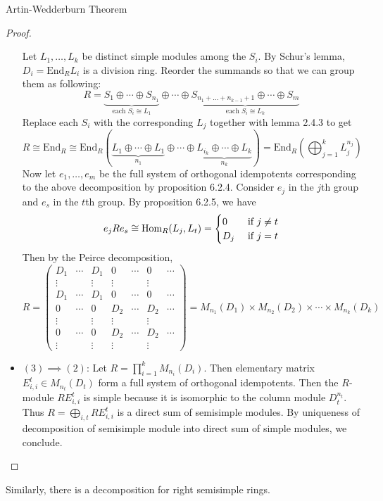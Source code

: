 \documentclass[a4paper]{article}
\begin{document}
\begin{thm}{Artin-Wedderburn Theorem}{}
\begin{proof}
\begin{itemize}
Let $L_1,\dots,L_k$ be distinct simple modules among the $S_i$. By Schur's lemma, $D_i=\text{End}_RL_i$ is a division ring. Reorder the summands so that we can group them as following: $$R=\underbrace{S_1\oplus\cdots\oplus S_{n_1}}_{\text{each }S_i\cong L_1}\oplus\cdots\oplus\underbrace{S_{n_1+\dots+n_{k-1}+1}\oplus\cdots\oplus S_m}_{\text{each }S_i\cong L_k}$$ Replace each $S_i$ with the corresponding $L_j$ together with lemma 2.4.3 to get $$R\cong\text{End}_R\cong\text{End}_R\left(\underbrace{L_1\oplus\cdots\oplus L_1}_{n_1}\oplus\cdots\oplus\underbrace{L_{i_k}\oplus\cdots\oplus L_k}_{n_k}\right)=\text{End}_R\left(\bigoplus_{j=1}^kL_j^{n_j}\right)$$ Now let $e_1,\dots,e_m$ be the full system of orthogonal idempotents corresponding to the above decomposition by proposition 6.2.4. Consider $e_j$ in the $j$th group and $e_s$ in the $t$th group. By proposition 6.2.5, we have $$e_jRe_s\cong\operatorname{Hom}_R(L_j,L_t)=\begin{cases}
0 & \text{ if } j\neq t\\
D_j & \text{ if }j=t
\end{cases}$$ Then by the Peirce decomposition, $$R=\begin{pmatrix}
D_1 & \cdots & D_1 & 0 & \cdots & 0 & \cdots\\
\vdots & & \vdots & \vdots & & \vdots & \\
D_1 & \cdots & D_1 & 0 & \cdots & 0 & \cdots\\
0 & \cdots & 0 & D_2 & \cdots & D_2 & \cdots\\
\vdots & & \vdots & \vdots & & \vdots & \\
0 & \cdots & 0 & D_2 & \cdots & D_2 & \cdots\\
\vdots & & \vdots & \vdots & & \vdots & 
\end{pmatrix}=M_{n_1}(D_1)\times M_{n_2}(D_2)\times\cdots\times M_{n_k}(D_k)$$
\item $(3)\implies(2)$: Let $R=\prod_{i=1}^kM_{n_i}(D_i)$. Then elementary matrix $E_{i,i}^t\in M_{n_t}(D_t)$ form a full system of orthogonal idempotents. Then the $R$-module $RE_{i,i}^t$ is simple because it is isomorphic to the column module $D_t^{n_t}$. Thus $R=\bigoplus_{i,t}RE_{i,i}^t$ is a direct sum of semisimple modules. By uniqueness of decomposition of semisimple module into direct sum of simple modules, we conclude. 
\end{itemize}
\end{proof}
\end{thm}

Similarly, there is a decomposition for right semisimple rings. 
\end{document}
